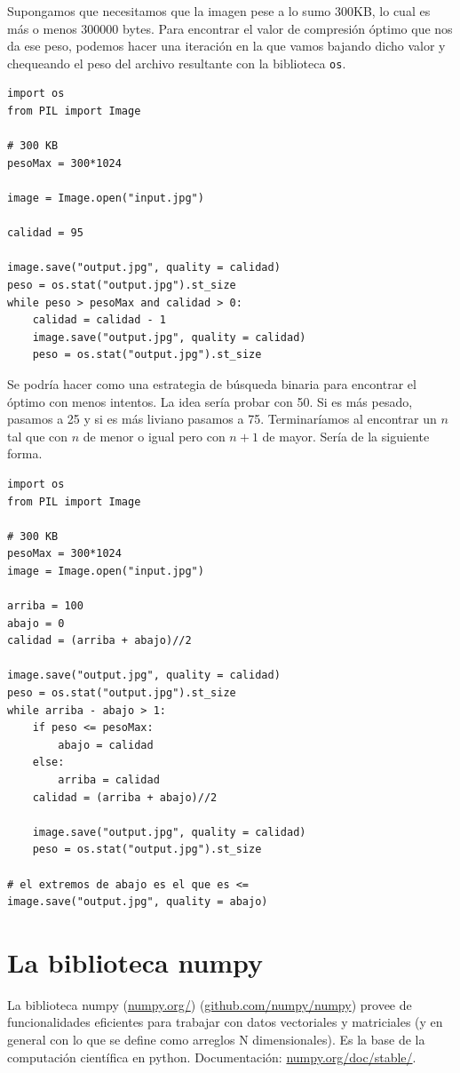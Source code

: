 \documentclass[a4paper, 12pt]{report}
\theoremstyle{definition}
\begin{document}
Supongamos que necesitamos que la imagen pese a lo sumo 300KB, lo cual es más o menos 300000 bytes. Para encontrar el valor de compresión óptimo que nos da ese peso, podemos hacer una iteración en la que vamos bajando dicho valor y chequeando el peso del archivo resultante con la biblioteca {\tt os}.
\begin{verbatim}
import os
from PIL import Image

# 300 KB
pesoMax = 300*1024

image = Image.open("input.jpg")

calidad = 95

image.save("output.jpg", quality = calidad)
peso = os.stat("output.jpg").st_size
while peso > pesoMax and calidad > 0:
    calidad = calidad - 1
    image.save("output.jpg", quality = calidad)
    peso = os.stat("output.jpg").st_size
\end{verbatim}
Se podría hacer como una estrategia de búsqueda binaria para encontrar el óptimo con menos intentos. La idea sería probar con 50. Si es más pesado, pasamos a 25 y si es más liviano pasamos a 75. Terminaríamos al encontrar un $n$ tal que con $n$ de menor o igual pero con $n+1$ de mayor. Sería de la siguiente forma.
\begin{verbatim}
import os
from PIL import Image

# 300 KB
pesoMax = 300*1024
image = Image.open("input.jpg")

arriba = 100
abajo = 0
calidad = (arriba + abajo)//2

image.save("output.jpg", quality = calidad)
peso = os.stat("output.jpg").st_size
while arriba - abajo > 1:
    if peso <= pesoMax:
        abajo = calidad
    else:
        arriba = calidad
    calidad = (arriba + abajo)//2
    
    image.save("output.jpg", quality = calidad)
    peso = os.stat("output.jpg").st_size

# el extremos de abajo es el que es <=
image.save("output.jpg", quality = abajo)
\end{verbatim}

\section{La biblioteca numpy}

La biblioteca numpy (\href{https://numpy.org/}{numpy.org/}) (\href{https://github.com/numpy/numpy}{github.com/numpy/numpy}) provee de funcionalidades eficientes para trabajar con datos vectoriales y matriciales (y en general con lo que se define como arreglos N dimensionales). Es la base de la computación científica en python. Documentación: \href{https://numpy.org/doc/stable/}{numpy.org/doc/stable/}.
\end{document}
